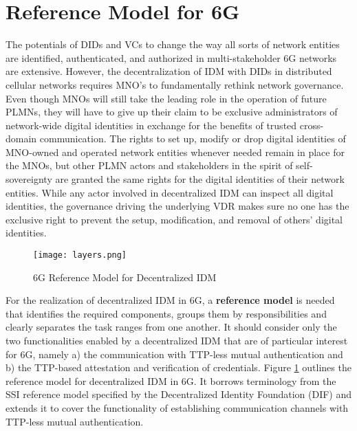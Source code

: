 \documentclass[conference]{IEEEtran}
\begin{document}
\section{Reference Model for 6G}
\label{architecture}
The potentials of DIDs and VCs to change the way all sorts of network entities are identified, authenticated, and authorized in multi-stakeholder 6G networks are extensive. However, the decentralization of IDM with DIDs in distributed cellular networks requires MNO's to fundamentally rethink network governance. Even though MNOs will still take the leading role in the operation of future PLMNs, they will have to give up their claim to be exclusive administrators of network-wide digital identities in exchange for the benefits of trusted cross-domain communication. The rights to set up, modify or drop digital identities of MNO-owned and operated network entities whenever needed remain in place for the MNOs, but other PLMN actors and stakeholders in the spirit of self-sovereignty are granted the same rights for the digital identities of their network entities. While any actor involved in decentralized IDM can inspect all digital identities, the governance driving the underlying VDR makes sure no one has the exclusive right to prevent the setup, modification, and removal of others' digital identities.

\begin{figure}[tp]
	\centerline{\texttt{[image: layers.png]}}
	\caption{6G Reference Model for Decentralized IDM}
	\label{fig_layers}
\end{figure} 

For the realization of decentralized IDM in 6G, a {\bf{reference model}} is needed that identifies the required components, groups them by responsibilities and clearly separates the task ranges from one another. It should consider only the two functionalities enabled by a decentralized IDM that are of particular interest for 6G, namely a) the communication with TTP-less mutual authentication and b) the TTP-based attestation and verification of credentials. Figure \ref{fig_layers} outlines the reference model for decentralized IDM in 6G. It borrows terminology from the SSI reference model specified by the Decentralized Identity Foundation (DIF) and extends it to cover the functionality of establishing communication channels with TTP-less mutual authentication.
\end{document}
